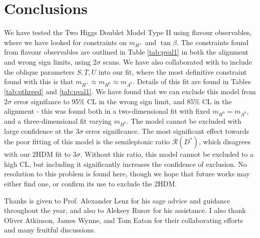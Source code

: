 \documentclass[a4paper,12pt]{article}
\begin{document}
\section{Conclusions}
We have tested the Two Higgs Doublet Model Type II using flavour observables, where we have looked for constraints on $m_{H^+}$ and $\tan\beta$. 
The constraints found from flavour observables are outlined in Table \ref{tab:pval1} in both the alignment and wrong sign limits, using $2\sigma$ scans. 
We have also collaborated with \cite{james} to include the oblique parameters $S,T,U$ into our fit, where the most definitive constraint found with this is that $m_{H^+}\approx m_{H^0}\approx m_{A^0}$. 
Details of this fit are found in Tables \ref{tab:pthreed} and \ref{tab:pval1}. 
We have found that we can exclude this model from $2\sigma$ error signifance to 95\% CL in the wrong sign limit, and 85\% CL in the alignment - this was found both in a two-dimensional fit with fixed $m_{H^0}=m_{A^0}$, and a three-dimensional fit varying $m_{H^0}$.
The model cannot be excluded with large confidence at the $3\sigma$ error significance.
The most significant effect towards the poor fitting of this model is the semileptonic ratio $\mathcal{R}(D^*)$, which disagrees with our 2HDM fit to $3\sigma$. 
Without this ratio, this model cannot be excluded to a high CL, but including it significantly increases the confidence of exclusion. 
No resolution to this problem is found here, though we hope that future works may either find one, or confirm its use to exclude the 2HDM. 

\acknowledgments
Thanks is given to Prof. Alexander Lenz for his sage advice and guidance throughout the year, and also to Aleksey Rusov for his assistance. 
I also thank Oliver Atkinson, James Wynne, and Tom Eaton for their collaborating efforts and many fruitful discussions.

%
\end{document}

